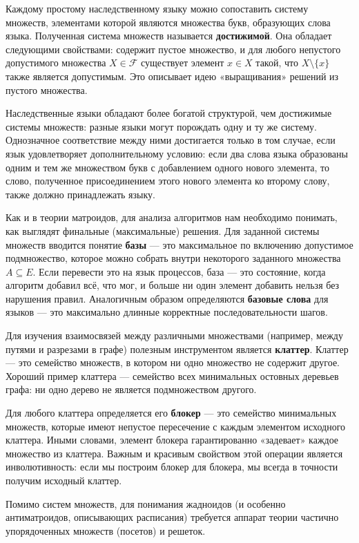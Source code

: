 Каждому простому наследственному языку можно сопоставить систему множеств, элементами которой являются множества букв, образующих слова языка. Полученная система множеств называется \textbf{достижимой}. Она обладает следующими свойствами: содержит пустое множество, и для любого непустого допустимого множества $X \in \mathcal{F}$ существует элемент $x \in X$ такой, что $X \setminus \{x\}$ также является допустимым. Это описывает идею «выращивания» решений из пустого множества. 

Наследственные языки обладают более богатой структурой, чем достижимые системы множеств: разные языки могут порождать одну и ту же систему. Однозначное соответствие между ними достигается только в том случае, если язык удовлетворяет дополнительному условию: если два слова языка образованы одним и тем же множеством букв с добавлением одного нового элемента, то слово, полученное присоединением этого нового элемента ко второму слову, также должно принадлежать языку. 

Как и в теории матроидов, для анализа алгоритмов нам необходимо понимать, как выглядят финальные (максимальные) решения. Для заданной системы множеств вводится понятие \textbf{базы} — это максимальное по включению допустимое подмножество, которое можно собрать внутри некоторого заданного множества $A \subseteq E$. Если перевести это на язык процессов, база — это состояние, когда алгоритм добавил всё, что мог, и больше ни один элемент добавить нельзя без нарушения правил. Аналогичным образом определяются \textbf{базовые слова} для языков — это максимально длинные корректные последовательности шагов.

Для изучения взаимосвязей между различными множествами (например, между путями и разрезами в графе) полезным инструментом является \textbf{клаттер}. Клаттер — это семейство множеств, в котором ни одно множество не содержит другое. Хороший пример клаттера — семейство всех минимальных остовных деревьев графа: ни одно дерево не является подмножеством другого. 

Для любого клаттера определяется его \textbf{блокер} — это семейство минимальных множеств, которые имеют непустое пересечение с каждым элементом исходного клаттера. Иными словами, элемент блокера гарантированно «задевает» каждое множество из клаттера. Важным и красивым свойством этой операции является инволютивность: если мы построим блокер для блокера, мы всегда в точности получим исходный клаттер.

Помимо систем множеств, для понимания жадноидов (и особенно антиматроидов, описывающих расписания) требуется аппарат теории частично упорядоченных множеств (посетов) и решеток. 

